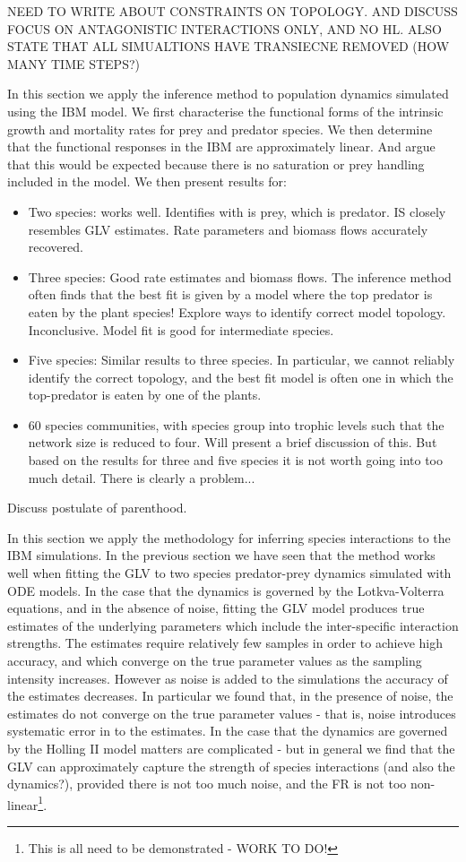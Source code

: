 NEED TO WRITE ABOUT CONSTRAINTS ON TOPOLOGY. AND DISCUSS FOCUS ON ANTAGONISTIC INTERACTIONS ONLY, AND NO HL. ALSO STATE THAT ALL SIMUALTIONS HAVE TRANSIECNE REMOVED (HOW MANY TIME STEPS?)

In this section we apply the inference method to population dynamics simulated using the IBM model. We first characterise the functional forms of the intrinsic growth and mortality rates for prey and predator species. We then determine that the functional responses in the IBM are approximately linear. And argue that this would be expected because there is no saturation or prey handling included in the model. We then present results for:
\begin{itemize}
	\item Two species: works well. Identifies with is prey, which is predator. IS closely resembles GLV estimates. Rate parameters and biomass flows accurately recovered.
	\item Three species: Good rate estimates and biomass flows. The inference method often finds that the best fit is given by a model where the top predator is eaten by the plant species! Explore ways to identify correct model topology. Inconclusive. Model fit is good for intermediate species.
	\item Five species: Similar results to three species. In particular, we cannot reliably identify the correct topology, and the best fit model is often one in which the top-predator is eaten by one of the plants.
	\item 60 species communities, with species group into trophic levels such that the network size is reduced to four.   Will present a brief discussion of this. But based on the results for three and five species it is not worth going into too much detail. There is clearly a problem... 
\end{itemize} 
Discuss postulate of parenthood.

In this section we apply the methodology for inferring species interactions to the IBM simulations. In the previous section we have seen that the method works well when fitting the GLV to two species predator-prey dynamics simulated with ODE models. In the case that the dynamics is governed by the Lotkva-Volterra equations, and in the absence of noise, fitting the GLV model produces true estimates of the underlying parameters which include the inter-specific interaction strengths. The estimates require relatively few samples in order to achieve high accuracy, and which converge on the true parameter values as the sampling intensity increases. However as noise is added to the simulations the accuracy of the estimates decreases. In particular we found that, in the presence of noise, the estimates do not converge on the true parameter values - that is, noise introduces systematic error in to the estimates. In the case that the dynamics are governed by the Holling II model matters are complicated - but in general we find that the GLV can approximately capture the strength of species interactions (and also the dynamics?), provided there is not too much noise, and the FR is not too non-linear\footnote{This is all need to be demonstrated - WORK TO DO!}.

